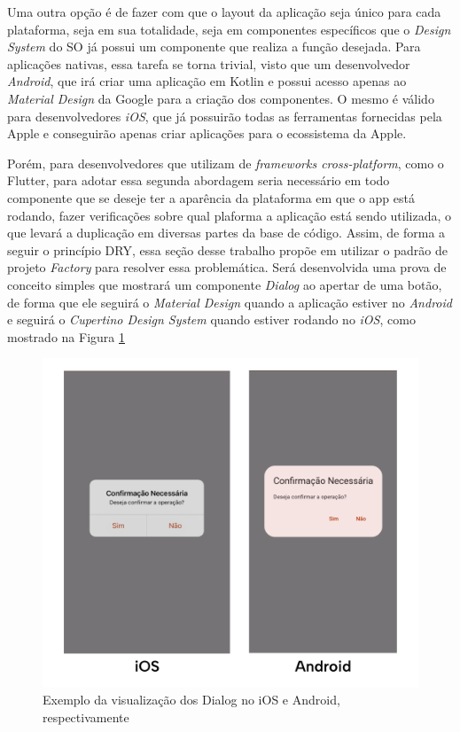 \documentclass[12pt, %
openright, 
oneside, %
a4paper,    %
brazil]{facom-ufu-abntex2}
\begin{document}
Uma outra opção é de fazer com que o layout da aplicação seja único para cada plataforma, seja em sua totalidade, seja em componentes específicos que o \textit{Design System} do SO já possui um componente que realiza a função desejada. Para aplicações nativas, essa tarefa se torna trivial, visto que um desenvolvedor \textit{Android}, que irá criar uma aplicação em Kotlin e possui acesso apenas ao \textit{Material Design} da Google para a criação dos componentes. O mesmo é válido para desenvolvedores \textit{iOS}, que já possuirão todas as ferramentas fornecidas pela Apple e conseguirão apenas criar aplicações para o ecossistema da Apple.

Porém, para desenvolvedores que utilizam de \textit{frameworks cross-platform}, como o Flutter, para adotar essa segunda abordagem seria necessário em todo componente que se deseje ter a aparência da plataforma em que o app está rodando, fazer verificações sobre qual plaforma a aplicação está sendo utilizada, o que levará a duplicação em diversas partes da base de código. Assim, de forma a seguir o princípio DRY, essa  seção desse trabalho propõe em utilizar o padrão de projeto \textit{Factory} para resolver essa problemática. Será desenvolvida uma prova de conceito simples que mostrará um componente \textit{Dialog} ao apertar de uma botão, de forma que ele seguirá o \textit{Material Design} quando a aplicação estiver no \textit{Android} e seguirá o \textit{Cupertino Design System} quando estiver rodando no \textit{iOS}, como mostrado na Figura \ref{fig:plaforms_dialog}

\begin{figure}[ht]
    \centering
    \includegraphics[width=.65\textwidth]{figures/dialog/platforms_dialog.png}
    \caption{Exemplo da visualização dos Dialog no iOS e Android, respectivamente}
    \label{fig:plaforms_dialog}
\end{figure}
\end{document}
